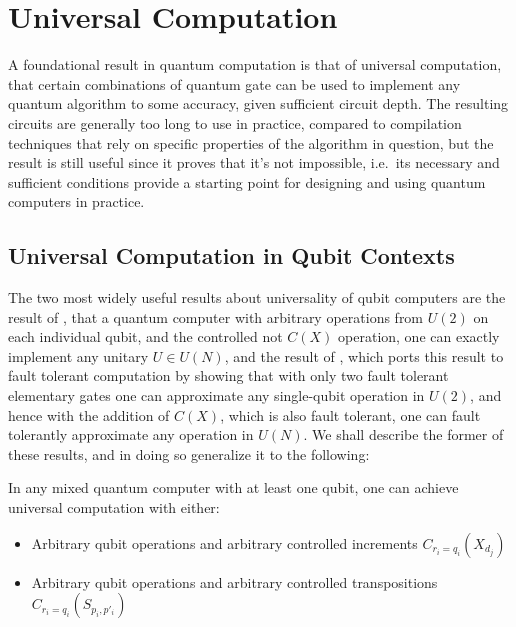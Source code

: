 \chapter[UNIVERSAL COMPUTATION]{Universal Computation}\label{universality}

A foundational result in quantum computation is that of universal computation, that certain combinations of quantum gate can be used to implement any quantum algorithm to some accuracy, given sufficient circuit depth. The resulting circuits are generally too long to use in practice, compared to compilation techniques that rely on specific properties of the algorithm in question, but the result is still useful since it proves that it's not impossible, i.e.\ its necessary and sufficient conditions provide a starting point for designing and using quantum computers in practice.

\section{Universal Computation in Qubit Contexts}
The two most widely useful results about universality of qubit computers are the result of \cite{cnot-decomposition}, that a quantum computer with arbitrary operations from $U(2)$ on each individual qubit, and the controlled not $C(X)$ operation, one can exactly implement any unitary $U \in U(N)$, and the result of \cite{universal-qubit}, which ports this result to fault tolerant computation by showing that with only two fault tolerant elementary gates one can approximate any single-qubit operation in $U(2)$, and hence with the addition of $C(X)$, which is also fault tolerant, one can fault tolerantly approximate any operation in $U(N)$. We shall describe the former of these results, and in doing so generalize it to the following:

\begin{theorem}\label{mixed-universal}
	In any mixed quantum computer with at least one qubit, one can achieve universal computation with either:
\begin{itemize}
	\item Arbitrary qubit operations and arbitrary controlled increments $C_{r_i=q_i}(X_{d_j})$
	\item Arbitrary qubit operations and arbitrary controlled transpositions $C_{r_i=q_i}(S_{p_i,p'_i})$
\end{itemize}
\end{theorem}

